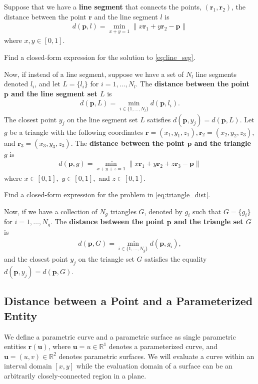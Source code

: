  Suppose that we have a \textbf{line segment} that connects the points, $(\bm{r}_1, \bm{r}_2)$, the distance between the point $\bm{r}$ and the line segment $l$ is
 \begin{align}
 	d(\bm{p}, l) = \min_{x+y=1} \|x\bm{r}_1 + y \bm{r}_2 - \bm{p} \|
 	\label{eq:line_seg}
 \end{align}
 where $x, y \in [0, 1 ]$.
 \begin{homework}
 	Find a closed-form expression for the solution to \eqref{eq:line_seg}.
 \end{homework}
%
Now, if instead of a line segment, suppose we have a set of $N_l$ line segments denoted $l_i$, and let $L=\{l_i\}$ for $i=1,\ldots,N_l$. The \textbf{distance between the point $\bm{p}$ and the line segment set $L$} is 
%
\begin{align}
	d(\bm{p}, L) = \min_{i\in \{1,\ldots, N_l\}} d(\bm{p}, l_i).
\end{align}
%
The closest point $y_j$ on the line segment set $L$ satisfies $d(\bm{p}, y_j) = d(\bm{p}, L)$.
%
Let $g$ be a triangle with the following coordinates  $\bm{r}=(x_1,y_1,z_1), \bm{r}_2 = (x_2, y_2, z_3)$, and $\bm{r}_3 = (x_3,y_3,z_3)$. The \textbf{distance between the point $\bm{p}$ and the triangle $g$} is 
%
\begin{align}
	d(\bm{p}, g) = \min_{x+y+z=1} \| x\bm{r}_1 + y\bm{r}_2 + z \bm{r}_3 - \bm{p} \|
	\label{eq:triangle_dist}
\end{align}
%
where $x \in [0,1], \,\, y\in [0,1],$ and $z \in [0,1]$. 
%
\begin{homework}
	Find a closed-form expression for the problem in \eqref{eq:triangle_dist}.
\end{homework}
 
 Now, if we have a collection of $N_g$ triangles $G$, denoted by $g_i$ such that $G =\{g_i\}$ for $i=1,\ldots,N_g$. The \textbf{distance between the point $\bm{p}$ and the triangle set $G$} is 
 \begin{align}
 	d(\bm{p}, G) = \min_{i\in \{1,\ldots, N_g\}} d(\bm{p}, g_i),
 \end{align}
 and the closest point $y_j$ on the triangle set $G$ satisfies the equality $d(\bm{p}, y_j) = d(\bm{p}, G)$.
 
 \subsection{Distance between a Point and a  Parameterized  Entity}
We define a parametric curve and a parametric surface as single parametric entities $\bm{r}(\bm{u})$, where $\bm{u} = u\in \mathbb{R}^1$ denotes a parameterized curve, and $\bm{u} = (u,v) \in \mathbb{R}^2$ denotes parametric surfaces. We will evaluate a curve within an interval domain \eg $[x,y]$ while the evaluation domain of a surface can be an arbitrarily closely-connected region in a plane. 

